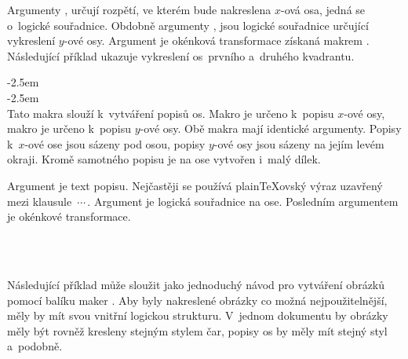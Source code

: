 \documentclass[12pt]{article}
\begin{document}
\smallskip
Argumenty ,  určují rozpětí, ve kterém bude nakreslena 
$x$-ová osa, jedná se o~logické souřadnice.
Obdobně argumenty ,  jsou logické souřadnice určující 
vykreslení $y$-ové osy. Argument  je okénková transformace získaná
makrem . Následující příklad ukazuje vykreslení
os~prvního a~druhého kvadrantu.

\begin{example}
\end{example}
\par\egroup

\medskip\bgroup
\noindent%
%
\addtolength{\leftskip}{2.5em}\parindent=0pt%
\null \kern-2.5em \\
\null \kern-2.5em \\[2pt]
Tato makra slouží k~vytváření popisů os. Makro  
je určeno k~popisu $x$-ové osy, makro  je určeno
k~popisu $y$-ové osy. Obě makra mají identické argumenty. Popisy k~$x$-ové ose
jsou sázeny pod osou, popisy $y$-ové osy jsou sázeny na jejím levém okraji.
Kromě samotného popisu je na ose vytvořen i~malý dílek.

\smallskip
Argument  je text popisu. Nejčastěji se používá plain\TeX ovský
výraz uzavřený mezi klausule \mbox{$\,\cdots\,$}. Argument
 je logická souřadnice na ose.
Posledním argumentem je okénkové transformace.

\begin{example}
   \\
   \\
\end{example}
\par\egroup

\medskip
Následující příklad může sloužit jako jednoduchý návod pro vytváření
obrázků pomocí balíku maker . 
Aby byly nakreslené obrázky co možná nejpoužitelnější, měly by mít svou
vnitřní logickou strukturu. V~jednom dokumentu by obrázky měly být rovněž 
kresleny stejným stylem čar, popisy os by měly mít stejný styl a~podobně.
\end{document}
